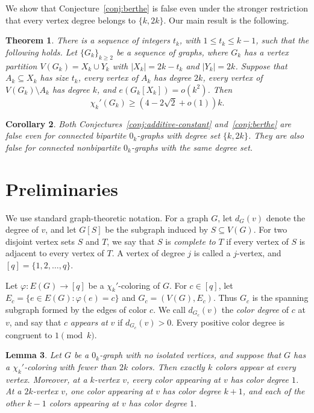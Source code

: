 \documentclass[10pt,a4paper]{amsart}
\newtheorem{theorem}{Theorem}[section]
\newtheorem{lemma}[theorem]{Lemma}
\newtheorem{corollary}[theorem]{Corollary}
\newcommand{\chik}{\chi_k'}
\begin{document}
We show that Conjecture~\ref{conj:berthe} is false even under the
stronger restriction that every vertex degree belongs to $\{k,2k\}$.
Our main result is the following.


\begin{theorem}\label{thm1}
There is a sequence of integers $t_k$, with $1\leq t_k\leq k-1$,
such that the following holds. Let $\{G_k\}_{k\geq2}$ be a sequence
of graphs, where $G_k$ has a vertex partition
$V(G_k)=X_k\cup Y_k$ with $|X_k|=2k-t_k$ and $|Y_k|=2k$.
Suppose that $A_k\subseteq X_k$ has size $t_k$, every vertex of
$A_k$ has degree $2k$, every vertex of $V(G_k)\setminus A_k$ has
degree $k$, and $e(G_k[X_k])=o(k^2)$. Then
\[
\chik(G_k)\geq\left(4-2\sqrt2+o(1)\right)k.
\]
\end{theorem}


\begin{corollary}\label{cor:counterexamples}
Both Conjectures~\ref{conj:additive-constant} and~\ref{conj:berthe} are
false even for connected bipartite $0_k$-graphs with degree set
$\{k,2k\}$. They are also false for connected nonbipartite $0_k$-graphs
with the same degree set.
\end{corollary}

\section{Preliminaries}\label{sec:notation}

We use standard graph-theoretic notation. For a graph $G$, let $d_G(v)$
denote the degree of $v$, and let $G[S]$ be the subgraph induced by
$S\subseteq V(G)$. For two disjoint vertex sets $S$ and $T$, we say
that $S$ is \emph{complete to} $T$ if every vertex of $S$ is adjacent
to every vertex of $T$. A vertex of degree $j$ is called a $j$-vertex,
and $[q]=\{1,2,\ldots,q\}$.

Let $\varphi:E(G)\to[q]$ be a $\chi_k'$-coloring of $G$. For
$c\in[q]$, let $E_c=\{e\in E(G):\varphi(e)=c\}$ and
$G_c=(V(G),E_c)$. Thus $G_c$ is the spanning subgraph formed by the
edges of color $c$. We call $d_{G_c}(v)$ the \emph{color degree} of
$c$ at $v$, and say that $c$ \emph{appears at} $v$ if
$d_{G_c}(v)>0$. Every positive color degree is congruent to
$1\pmod{k}$.

\begin{lemma}\label{lem:k-colors-at-vertex}
Let $G$ be a $0_k$-graph with no isolated vertices, and suppose that
$G$ has a $\chi_k'$-coloring with fewer than $2k$ colors. Then exactly
$k$ colors appear at every vertex. Moreover, at a $k$-vertex $v$, every
color appearing at $v$ has color degree $1$. At a $2k$-vertex $v$, one
color appearing at $v$ has color degree $k+1$, and each of the other
$k-1$ colors appearing at $v$ has color degree $1$.
\end{lemma}
\end{document}
